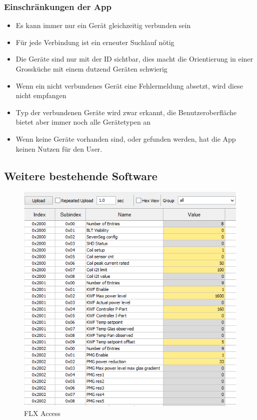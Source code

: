 \subsubsection{Einschränkungen der App}
\label{subsubsec:Einschränkungen der App}
\begin{itemize}
\item Es kann immer nur ein Gerät gleichzeitig verbunden sein
\item Für jede Verbindung ist ein erneuter Suchlauf nötig
\item Die Geräte sind nur mit der ID sichtbar, dies macht die Orientierung in einer Grossküche mit einem dutzend Geräten schwierig
\item Wenn ein nicht verbundenes Gerät eine Fehlermeldung absetzt, wird diese nicht empfangen
\item Typ der verbundenen Geräte wird zwar erkannt, die Benutzeroberfläche bietet aber immer noch alle Gerätetypen an
\item Wenn keine Geräte vorhanden sind, oder gefunden werden, hat die App keinen Nutzen für den User.
\end{itemize}


\subsection{Weitere bestehende Software}
\label{subsec:Weitere bestehende Software}

\begin{figure}
\includegraphics[scale=0.4]{analysis/res/flxaccess}
	\caption{FLX Access}
\end{figure}

